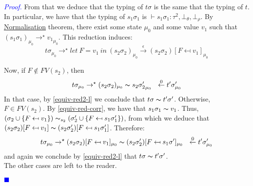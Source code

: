 \documentclass[a4paper,11pt,oneside]{article}
\theoremstyle{plain}
\newtheorem{lemma}[definition]{Lemma}
\renewenvironment{proof}{\noindent \begin{adjustwidth}{1.5em}{} \textcolor{blue}{\textit{Proof.}}}
{{\begin{tiny}\textcolor{blue}{$\blacksquare$}\end{tiny}}
\end{adjustwidth}~\\\noindent}
\newcommand{\bth}{\bot_\theta}
\newcommand{\brh}{\bot_\rho}
\begin{document}
\begin{proof}
	From that we deduce that the typing of $t\sigma$ is the same that the typing of $t$.
	In particular, we have that the typing of $s_1 \sigma_1$ is $\vdash s_1 \sigma_1 : \tau^2, \bth, \brh$.
	By \hyperlink{term-il}{Normalisation} theorem, there exist some state $\mu_0$ and some value $v_1$ such that $(s_1 \sigma_1)_{\mu_0} \rightarrow^\star {v_1}_{\mu_0}$. This reduction induces:	
$$ t\sigma_{\mu_0} \rightarrow^\star let~F=v_1~in~(s_2\sigma_2)_{\mu_0} \stackrel{\epsilon}{\rightarrow} (s_2\sigma_2)[F \mapsfrom v_1]_{\mu_0}$$ 	 
	 
	Now, if $F \not\in FV(s_2)$, then 
	$$t\sigma_{\mu_0}\rightarrow^\star (s_2\sigma_2)_{\mu_0} \thicksim {s_2\sigma_2'}_{\mu_0}~~ \stackrel{0}{\leftarrow} t'\sigma'_{\mu_0}$$	
	In that case, by \cref{equiv-red2-l} we conclude that $t\sigma \thicksim t'\sigma'$. 
Otherwise, 	$F \in FV(s_2)$. By \cref{equiv-red-corr}, we have that $ s_1\sigma_1 \thicksim v_1$. Thus, 
$(\sigma_2 \cup \{ F \mapsfrom v_1\}) \thicksim_{s_2} (\sigma_2' \cup \{ F \mapsfrom s_1\sigma_1'\})$, from which we deduce that $ (s_2\sigma_2)[F \mapsfrom v_1] \thicksim (s_2\sigma_2')[F \mapsfrom s_1\sigma_1']$. Therefore:
	$$t\sigma_{\mu_0}\rightarrow^\star (s_2\sigma_2)[F \mapsfrom v_1]_{\mu_0}  \thicksim (s_2\sigma_2')[F \mapsfrom s_1\sigma']_{\mu_0}~~ \stackrel{0}{\leftarrow} t'\sigma'_{\mu_0}$$
and again we conclude by \cref{equiv-red2-l} that $t\sigma \thicksim t'\sigma'$. \\

The other cases are left to the reader.


	\end{proof}	  
  	
	
	
	

	
\newpage


\end{document}
